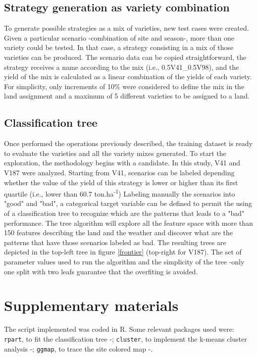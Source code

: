 \documentclass[syngen,nonblindrev]{informs3-syngen}
\begin{document}
\subsection {Strategy generation as variety combination}

To generate possible strategies as a mix of varieties, new test cases were created. 
Given a particular scenario -combination of site and season-, more than one variety could be tested. In that case, a strategy consisting in a mix of those varieties can be produced. 
The scenario data can be copied straightforward, the strategy receives a name according to the mix (i.e., 0.5V41\_0.5V98), and the yield of the mix is calculated as a linear combination of the yields of each variety. 
For simplicity, only increments of 10\% were considered to define the mix in the land assignment and a maximum of 5 different varieties to be assigned to a land.

\subsection {Classification tree}

Once performed the operations previously described, the training dataset is ready to evaluate the varieties and all the variety mixes generated. 
To start the exploration, the methodology begins with a candidate. 
In this study, V41 and V187 were analyzed. 
Starting from V41, scenarios can be labeled depending whether the value of the yield of this strategy is lower or higher than its first quartile (i.e., lower than 60.7 ton.ha\textsuperscript{-1})
Labeling manually the scenarios into "good" and "bad", a categorical target variable can be defined to permit the using of a classification tree to recognize which are the patterns that leads to a "bad" performance. 
The tree algorithm will explore all the feature space with more than 150 features describing the land and the weather and discover what are the patterns that have those scenarios labeled as bad. 
The resulting trees are depicted in the top-left tree in figure \ref{frontier} (top-right for V187).
The set of parameter values used to run the algorithm and the simplicity of the tree -only one split with two leafs guarantee that the overfiting is avoided. 

\section{Supplementary materials}

The script implemented was coded in R. 
Some relevant packages used were: \texttt{rpart}, to fit the classification tree -\cite{therneau2015package}; \texttt{cluster}, to implement the k-means cluster analysis -\cite{maechler2015package}; \texttt{ggmap}, to trace the site colored map -\cite{kahle2013ggmap}. 
\end{document}
